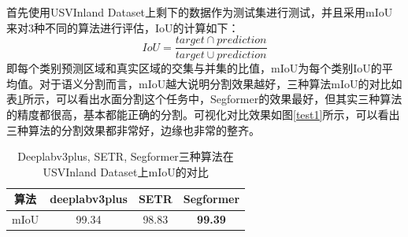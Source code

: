 \documentclass[cn,12pt,color=mine,scheme=chinese,bibstyle=gb7714-2015]{elegantbook}
\begin{document}
\begin{note}
	首先使用USVInland Dataset上剩下的数据作为测试集进行测试，并且采用mIoU来对3种不同的算法进行评估，IoU的计算如下：
	\[
		IoU=\frac{target\cap prediction}{target\cup prediction}
	\]
	即每个类别预测区域和真实区域的交集与并集的比值，mIoU为每个类别IoU的平均值。对于语义分割而言，mIoU越大说明分割效果越好，三种算法mIoU的对比如表\ref{res1}所示，可以看出水面分割这个任务中，Segformer的效果最好，但其实三种算法的精度都很高，基本都能正确的分割。可视化对比效果如图\ref{test1}所示，可以看出三种算法的分割效果都非常好，边缘也非常的整齐。
\end{note}

\begin{table}[h]
	\centering
	\caption{Deeplabv3plus, SETR, Segformer三种算法在USVInland Dataset上mIoU的对比}
	\label{res1}
	\begin{tabular}{cccc}
		\toprule
		算法 & deeplabv3plus & SETR & Segformer \\
		\midrule
		mIoU & 99.34 & 98.83 & \textbf{99.39} \\
		\bottomrule
	\end{tabular}
\end{table}
\end{document}
